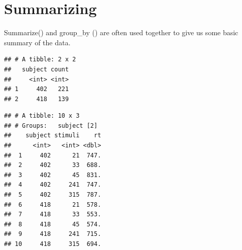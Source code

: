 \documentclass[]{book}
\newenvironment{Shaded}{\begin{snugshade}}{\end{snugshade}}
\newcommand{\KeywordTok}[1]{\textcolor[rgb]{0.13,0.29,0.53}{\textbf{#1}}}
\newcommand{\DataTypeTok}[1]{\textcolor[rgb]{0.13,0.29,0.53}{#1}}
\newcommand{\DecValTok}[1]{\textcolor[rgb]{0.00,0.00,0.81}{#1}}
\newcommand{\StringTok}[1]{\textcolor[rgb]{0.31,0.60,0.02}{#1}}
\newcommand{\OperatorTok}[1]{\textcolor[rgb]{0.81,0.36,0.00}{\textbf{#1}}}
\newcommand{\NormalTok}[1]{#1}
\begin{document}
\section{Summarizing}\label{summarizing}

Summarize() and group\_by () are often used together to give us some
basic summary of the data.

\begin{Shaded}
\end{Shaded}

\begin{verbatim}
## # A tibble: 2 x 2
##   subject count
##     <int> <int>
## 1     402   221
## 2     418   139
\end{verbatim}

\begin{Shaded}
\end{Shaded}

\begin{verbatim}
## # A tibble: 10 x 3
## # Groups:   subject [2]
##    subject stimuli    rt
##      <int>   <int> <dbl>
##  1     402      21  747.
##  2     402      33  688.
##  3     402      45  831.
##  4     402     241  747.
##  5     402     315  787.
##  6     418      21  578.
##  7     418      33  553.
##  8     418      45  574.
##  9     418     241  715.
## 10     418     315  694.
\end{verbatim}

\begin{Shaded}
\end{Shaded}
\end{document}
